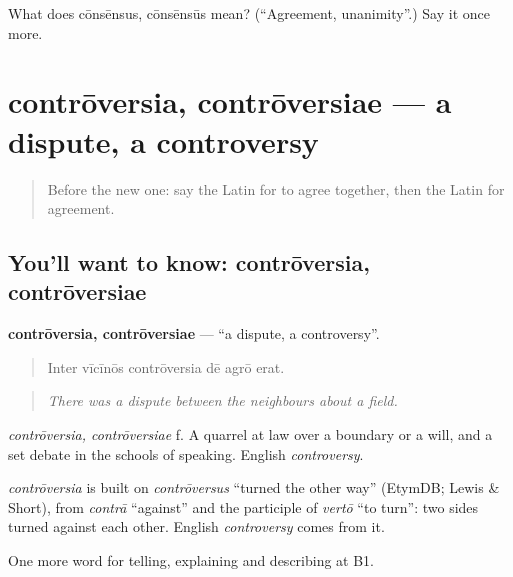 \begin{tcolorbox}[breakable,colback=teal!4,colframe=teal!35!black,title={Before you move on}]
What does cōnsēnsus, cōnsēnsūs mean? (\textquotedblleft{}Agreement, unanimity\textquotedblright{}.) Say it once more.
\end{tcolorbox}
\section[contrōversia, contrōversiae]{contrōversia, contrōversiae — a dispute, a controversy}

\label{lesson:LA-C358-controversia}



\begin{quote}
Before the new one: say the Latin for to agree together, then the Latin for agreement.
\end{quote}

\subsection*{You'll want to know: contrōversia, contrōversiae}
\textbf{contrōversia, contrōversiae} — \textquotedblleft{}a dispute, a controversy\textquotedblright{}.

\begin{quote}
Inter vīcīnōs contrōversia dē agrō erat.
\end{quote}

\begin{quote}
\emph{There was a dispute between the neighbours about a field.}
\end{quote}

\emph{contrōversia, contrōversiae} f. A quarrel at law over a boundary or a will, and a set debate in the schools of speaking. English \emph{controversy}.

\begin{cousinweb}
\emph{contrōversia} is built on \emph{contrōversus} \textquotedblleft{}turned the other way\textquotedblright{} (EtymDB; Lewis \& Short), from \emph{contrā} \textquotedblleft{}against\textquotedblright{} and the participle of \emph{vertō} \textquotedblleft{}to turn\textquotedblright{}: two sides turned against each other. English \emph{controversy} comes from it.
\end{cousinweb}

\begin{grammarlens}[title={What you've built}]
One more word for telling, explaining and describing at B1.
\end{grammarlens}

